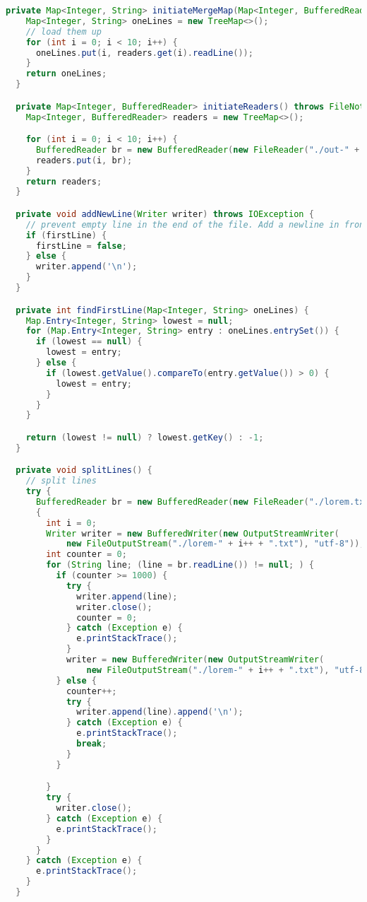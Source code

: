 \begin{lstlisting}[language=Java]
  private Map<Integer, String> initiateMergeMap(Map<Integer, BufferedReader> readers) throws IOException {
    Map<Integer, String> oneLines = new TreeMap<>();
    // load them up
    for (int i = 0; i < 10; i++) {
      oneLines.put(i, readers.get(i).readLine());
    }
    return oneLines;
  }

  private Map<Integer, BufferedReader> initiateReaders() throws FileNotFoundException {
    Map<Integer, BufferedReader> readers = new TreeMap<>();

    for (int i = 0; i < 10; i++) {
      BufferedReader br = new BufferedReader(new FileReader("./out-" + i + ".txt"));
      readers.put(i, br);
    }
    return readers;
  }

  private void addNewLine(Writer writer) throws IOException {
    // prevent empty line in the end of the file. Add a newline in front of the line to be added
    if (firstLine) {
      firstLine = false;
    } else {
      writer.append('\n');
    }
  }

  private int findFirstLine(Map<Integer, String> oneLines) {
    Map.Entry<Integer, String> lowest = null;
    for (Map.Entry<Integer, String> entry : oneLines.entrySet()) {
      if (lowest == null) {
        lowest = entry;
      } else {
        if (lowest.getValue().compareTo(entry.getValue()) > 0) {
          lowest = entry;
        }
      }
    }

    return (lowest != null) ? lowest.getKey() : -1;
  }

  private void splitLines() {
    // split lines
    try {
      BufferedReader br = new BufferedReader(new FileReader("./lorem.txt"));
      {
        int i = 0;
        Writer writer = new BufferedWriter(new OutputStreamWriter(
            new FileOutputStream("./lorem-" + i++ + ".txt"), "utf-8"));
        int counter = 0;
        for (String line; (line = br.readLine()) != null; ) {
          if (counter >= 1000) {
            try {
              writer.append(line);
              writer.close();
              counter = 0;
            } catch (Exception e) {
              e.printStackTrace();
            }
            writer = new BufferedWriter(new OutputStreamWriter(
                new FileOutputStream("./lorem-" + i++ + ".txt"), "utf-8"));
          } else {
            counter++;
            try {
              writer.append(line).append('\n');
            } catch (Exception e) {
              e.printStackTrace();
              break;
            }
          }

        }
        try {
          writer.close();
        } catch (Exception e) {
          e.printStackTrace();
        }
      }
    } catch (Exception e) {
      e.printStackTrace();
    }
  }


\end{lstlisting}
